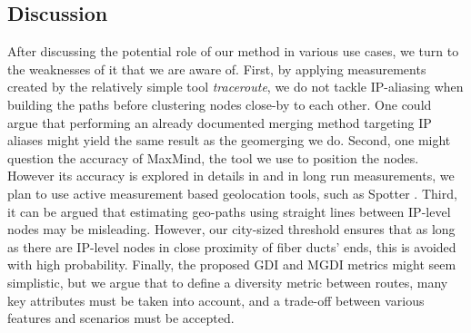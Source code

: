 \documentclass[peerreview]{IEEEtran}
\begin{document}
\subsection{Discussion} 

After discussing the potential role of our method in various use cases, we turn
to the weaknesses of it that we are aware of. First, by applying measurements
created by the relatively simple tool \textit{traceroute}, we do not tackle
IP-aliasing when building the paths before clustering nodes close-by to each
other. One could argue that performing an already documented merging method
targeting IP aliases might yield the same result as the geomerging we do.
Second, one might question the accuracy of MaxMind, the tool we use to position
the nodes. However its accuracy is explored in details in \cite{geocompare} and
in long run measurements, we plan to use active measurement based geolocation
tools, such as Spotter \cite{matray_spatial_2012}. Third, it can be argued that
estimating geo-paths using straight lines between IP-level nodes may be
misleading. However, our city-sized threshold ensures that as long as there are
IP-level nodes in close proximity of fiber ducts' ends, this is avoided with
high probability. Finally, the proposed GDI and MGDI metrics might seem
simplistic, but we argue that to define a diversity metric between routes, many
key attributes must be taken into account, and a trade-off between various
features and scenarios must be accepted.



\end{document}
